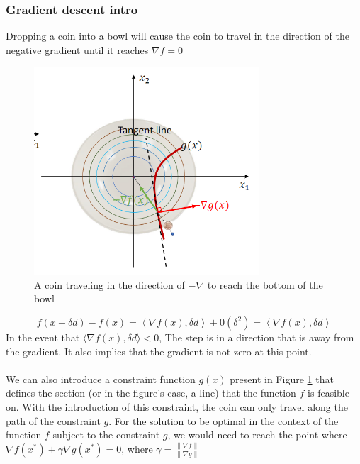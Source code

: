 \subsubsection{Gradient descent intro}
Dropping a coin into a bowl will cause the coin to travel in the direction of the negative gradient until it reaches $\nabla f = 0$
\begin{figure}[htbp]
  \centerline{\includegraphics[width=0.75\textwidth]{images/gradient_bowl.png}}
  \caption{A coin traveling in the direction of $-\nabla$ to reach the bottom of the bowl}
  \label{fig:gradient_bowl}
\end{figure}

\begin{equation}
  f(x+\delta d) - f(x) = \left\langle \nabla f(x), \delta d \right\rangle  + 0(\delta^2) = \left\langle \nabla f(x), \delta d \right\rangle
\end{equation}
In the event that $\langle \nabla f(x), \delta d  \rangle < 0$, The step is in a direction that is away from the gradient. It also implies that the gradient is not zero at this point.
\\ \\ 
We can also introduce a constraint function $g(x)$ present in Figure \ref{fig:gradient_bowl} that defines the section (or in the figure's case, a line) that the function $f$ is feasible on. With the introduction of this constraint, the coin can only travel along the path of the constraint $g$. For the solution to be optimal in the context of the function $f$ subject to the constraint $g$, we would need to reach the point where $\nabla f(x^*) + \gamma \nabla g(x^*) = 0 $, where $\gamma = \frac{\| \nabla f \|}{\| \nabla g \|}$

